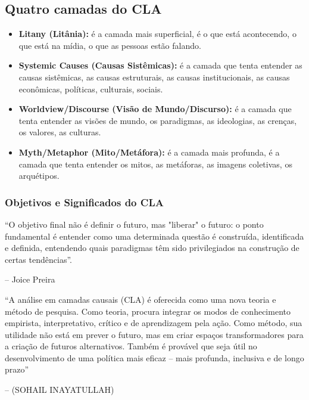 \subsection{Quatro camadas do CLA}
\begin{itemize}
    \item \textbf{Litany (Litânia):} é a camada mais superficial, é o que está acontecendo, o que está na mídia, o que as pessoas estão falando.
    \item \textbf{Systemic Causes (Causas Sistêmicas):} é a camada que tenta entender as causas sistêmicas, as causas estruturais, as causas institucionais, as causas econômicas, políticas, culturais, sociais.
    \item \textbf{Worldview/Discourse (Visão de Mundo/Discurso):} é a camada que tenta entender as visões de mundo, os paradigmas, as ideologias, as crenças, os valores, as culturas.
    \item \textbf{Myth/Metaphor (Mito/Metáfora):} é a camada mais profunda, é a camada que tenta entender os mitos, as metáforas, as imagens coletivas, os arquétipos.
\end{itemize}

\subsubsection*{Objetivos e Significados do CLA}
\begin{thinkerquote}
    “O objetivo final não é definir o futuro, mas "liberar" o futuro: o ponto fundamental é entender como uma determinada questão é construída, identificada e definida, entendendo quais paradigmas têm sido privilegiados na construção de certas tendências”.
    \begin{flushright}
        -- Joice Preira
    \end{flushright}
\end{thinkerquote}

\begin{thinkerquote}
“A análise em camadas causais (CLA) é oferecida como uma nova teoria e método de pesquisa. Como teoria, procura integrar os modos de conhecimento empirista, interpretativo, crítico e de aprendizagem pela ação. Como método, sua utilidade não está em prever o futuro, mas em criar espaços transformadores para a criação de futuros alternativos. Também é provável que seja útil no desenvolvimento de uma política mais eficaz – mais profunda, inclusiva e de longo prazo” 
\begin{flushright}
    -- (SOHAIL INAYATULLAH)
    \end{flushright}
\end{thinkerquote}

